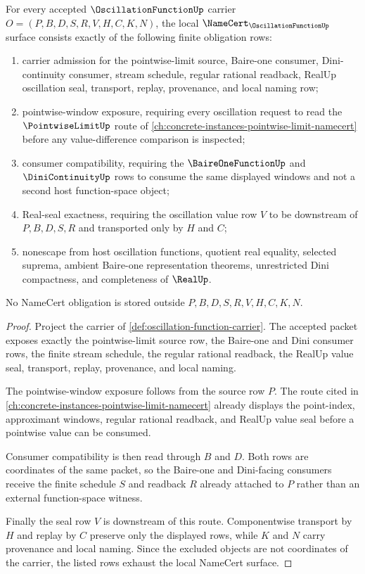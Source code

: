 \begin{theorem}
\label{thm:oscillation-function-namecert-obligations}
For every accepted $\OscillationFunctionUp$ carrier $O=(P,B,D,S,R,V,H,C,K,N)$, the local $\NameCert_{\OscillationFunctionUp}$ surface consists exactly of the following finite obligation rows:
\begin{enumerate}
\item carrier admission for the pointwise-limit source, Baire-one consumer, Dini-continuity consumer, stream schedule, regular rational readback, RealUp oscillation seal, transport, replay, provenance, and local naming row;
\item pointwise-window exposure, requiring every oscillation request to read the $\PointwiseLimitUp$ route of \autoref{ch:concrete-instances-pointwise-limit-namecert} before any value-difference comparison is inspected;
\item consumer compatibility, requiring the $\BaireOneFunctionUp$ and $\DiniContinuityUp$ rows to consume the same displayed windows and not a second host function-space object;
\item Real-seal exactness, requiring the oscillation value row $V$ to be downstream of $P,B,D,S,R$ and transported only by $H$ and $C$;
\item nonescape from host oscillation functions, quotient real equality, selected suprema, ambient Baire-one representation theorems, unrestricted Dini compactness, and completeness of $\RealUp$.
\end{enumerate}
No NameCert obligation is stored outside $P,B,D,S,R,V,H,C,K,N$.
\end{theorem}
\begin{proof}
Project the carrier of \autoref{def:oscillation-function-carrier}. The accepted packet exposes exactly the pointwise-limit source row, the Baire-one and Dini consumer rows, the finite stream schedule, the regular rational readback, the RealUp value seal, transport, replay, provenance, and local naming.

The pointwise-window exposure follows from the source row $P$. The route cited in \autoref{ch:concrete-instances-pointwise-limit-namecert} already displays the point-index, approximant windows, regular rational readback, and RealUp value seal before a pointwise value can be consumed.

Consumer compatibility is then read through $B$ and $D$. Both rows are coordinates of the same packet, so the Baire-one and Dini-facing consumers receive the finite schedule $S$ and readback $R$ already attached to $P$ rather than an external function-space witness.

Finally the seal row $V$ is downstream of this route. Componentwise transport by $H$ and replay by $C$ preserve only the displayed rows, while $K$ and $N$ carry provenance and local naming. Since the excluded objects are not coordinates of the carrier, the listed rows exhaust the local NameCert surface.
\end{proof}

